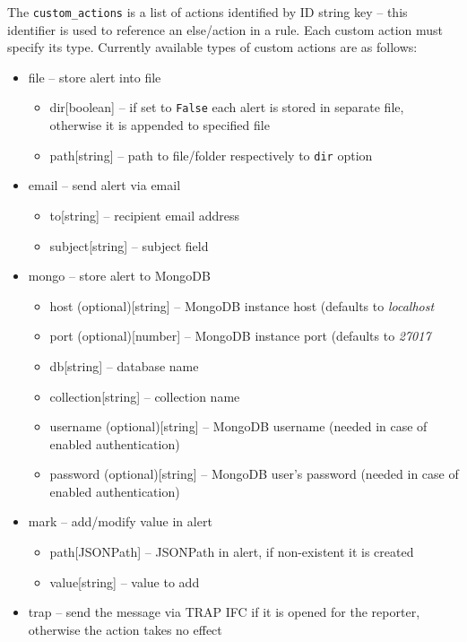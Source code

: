 \documentclass[11pt,a4paper]{article}
\begin{document}
The \texttt{custom\_actions} is a list of actions identified by ID string key -- this identifier is used to reference an else/action in a rule. Each custom action must specify its type. Currently available types of custom actions are as follows:

\begin{itemize}
		\label{actions}

	\item{file -- store alert into file}
		\begin{itemize}
			\item{dir[boolean] -- if set to \texttt{False} each alert is stored in separate file, otherwise it is appended to specified file}
			\item{path[string] -- path to file/folder respectively to \texttt{dir} option}
		\end{itemize}
	\item{email -- send alert via email}
		\begin{itemize}
			\item{to[string] -- recipient email address}
			\item{subject[string] -- subject field}
		\end{itemize}
	\item{mongo -- store alert to MongoDB}
		\begin{itemize}
			\item{host (optional)[string] -- MongoDB instance host (defaults to \textit{localhost}}
			\item{port (optional)[number] -- MongoDB instance port (defaults to \textit{27017}}
			\item{db[string] -- database name}
			\item{collection[string] -- collection name}
			\item{username (optional)[string] -- MongoDB username (needed in case of enabled authentication)}
			\item{password (optional)[string] -- MongoDB user's password (needed in case of enabled authentication)}
		\end{itemize}
	\item{mark -- add/modify value in alert}
		\begin{itemize}
			\item{path[JSONPath] -- JSONPath in alert, if non-existent it is created}
			\item{value[string] -- value to add}
		\end{itemize}
	\item{trap -- send the message via TRAP IFC if it is opened for the reporter, otherwise the action takes no effect}

\end{itemize}
\end{document}
